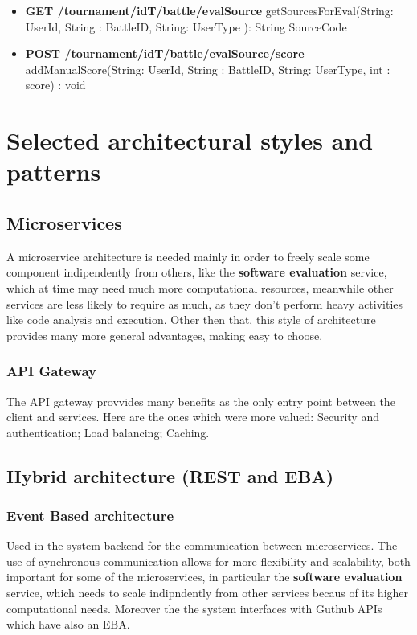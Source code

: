 \begin{itemize}
    \item \textbf{GET /tournament/{idT}/battle/evalSource}\newline
    getSourcesForEval(String: UserId, String : BattleID, String: UserType ): String SourceCode
    \item \textbf{POST /tournament/{idT}/battle/evalSource/score}\newline
    addManualScore(String: UserId, String : BattleID, String: UserType, int : score)
    : void
\end{itemize}
\section{Selected architectural styles and patterns}

\subsection{Microservices}

A microservice architecture is needed mainly in order to freely scale some component indipendently from others, like the \textbf{software evaluation} service, which at time may need much more computational resources, meanwhile other services are less likely to require as much, as they don't perform heavy activities like code analysis and execution.
Other then that, this style of architecture provides many more general advantages, making easy to choose. 

\subsubsection{API Gateway}

The API gateway provvides many benefits as the only entry point between the client and services.
Here are the ones which were more valued: Security and authentication; Load balancing; Caching. 

\subsection{Hybrid architecture (REST and EBA)}

\subsubsection{Event Based architecture}

Used in the system backend for the communication between microservices.  
The use of aynchronous communication allows for more flexibility and scalability, both important for some of the microservices, in particular the \textbf{software evaluation} service, which needs to scale indipndently from other services becaus of its higher computational needs.
Moreover the the system interfaces with Guthub APIs which have also an EBA.

